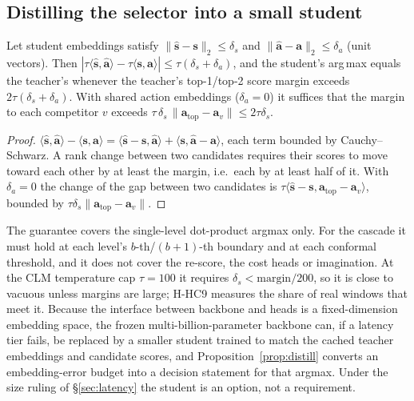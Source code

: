 \subsection{Distilling the selector into a small student}
\begin{proposition}\label{prop:distill}
Let student embeddings satisfy $\|\hat{\mathbf s}-\mathbf s\|_2\le\delta_s$ and $\|\hat{\mathbf a}-\mathbf a\|_2\le\delta_a$ (unit vectors).
Then $|\tau\langle\hat{\mathbf s},\hat{\mathbf a}\rangle-\tau\langle\mathbf s,\mathbf a\rangle|\le\tau(\delta_s+\delta_a)$, and the student's
arg\,max equals the teacher's whenever the teacher's top-1/top-2 score margin exceeds $2\tau(\delta_s+\delta_a)$. With shared action embeddings ($\delta_a=0$) it suffices that the margin to each competitor $v$ exceeds $\tau\,\delta_s\,\|\mathbf a_{\text{top}}-\mathbf a_v\|\le2\tau\delta_s$.
\end{proposition}
\begin{proof}
$\langle\hat{\mathbf s},\hat{\mathbf a}\rangle-\langle\mathbf s,\mathbf a\rangle=\langle\hat{\mathbf s}-\mathbf s,\hat{\mathbf a}\rangle+\langle\mathbf s,\hat{\mathbf a}-\mathbf a\rangle$,
each term bounded by Cauchy--Schwarz. A rank change between two candidates requires their scores to move toward each other by
at least the margin, i.e.\ each by at least half of it. With $\delta_a=0$ the change of the gap between two candidates is $\tau\langle\hat{\mathbf s}-\mathbf s,\mathbf a_{\text{top}}-\mathbf a_v\rangle$, bounded by $\tau\delta_s\|\mathbf a_{\text{top}}-\mathbf a_v\|$.\qedhere
\end{proof}
\noindent The guarantee covers the single-level dot-product argmax only. For the cascade it must hold at each level's $b$-th/$(b{+}1)$-th boundary and at each conformal threshold, and it does not cover the re-score, the cost heads or imagination. At the CLM temperature cap $\tau=100$ it requires $\delta_s<\text{margin}/200$, so it is close to vacuous unless margins are large; H-HC9 measures the share of real windows that meet it. Because the interface between backbone and heads is a fixed-dimension embedding space, the frozen
multi-billion-parameter backbone can, if a latency tier fails, be replaced by a smaller student trained to match the cached teacher embeddings and
candidate scores, and Proposition~\ref{prop:distill} converts an embedding-error budget into a decision statement for that argmax. Under the size ruling of \S\ref{sec:latency} the student is an option, not a requirement.
